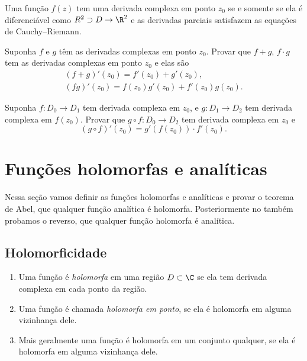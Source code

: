 \begin{teorema}
Uma função $f(z)$ tem uma derivada complexa em ponto $z_0$ se e somente se
ela é diferenciável como $R^2\supset D \to \R^2$ e as derivadas parciais
satisfazem as equações de Cauchy--Riemann.
\end{teorema}

\begin{problema}
Suponha $f$ e $g$ têm as derivadas complexas em ponto $z_0$.
Provar que $f+g$, $f\cdot g$ tem as derivadas complexas em ponto $z_0$
e elas são
\begin{gather}
(f+g)'(z_0) = f'(z_0)+g'(z_0), \\
(fg)'(z_0) = f(z_0) g'(z_0) + f'(z_0) g(z_0).
\end{gather}
\end{problema}

\begin{problema}
Suponha $f: D_0 \to D_1$ tem derivada complexa em $z_0$,
e $g : D_1 \to D_2$ tem derivada complexa em $f(z_0)$.
Provar que $g\circ f: D_0 \to D_2$ tem derivada complexa em $z_0$
e
\begin{equation}
(g\circ f)'(z_0) = g'(f(z_0)) \cdot f'(z_0).
\end{equation} 
\end{problema}

\section{Funções holomorfas e analíticas}
Nessa seção vamos definir as funções holomorfas e analíticas
e provar o teorema de Abel, que qualquer função analítica é holomorfa.
Posteriormente no  também probamos o reverso,
que qualquer função holomorfa é analítica.

\subsection{Holomorficidade}

\begin{defin}
\label{d:holomorfa}
\begin{enumerate}
\item Uma função é \emph{holomorfa} em uma região $D\subset\C$ se ela tem derivada complexa em cada ponto da região.
\item Uma função é chamada \emph{holomorfa em ponto}, se ela é holomorfa em alguma vizinhança dele.
\item Mais geralmente uma função é holomorfa em um conjunto qualquer, se ela é holomorfa em alguma vizinhança dele.
\end{enumerate}
\end{defin}

